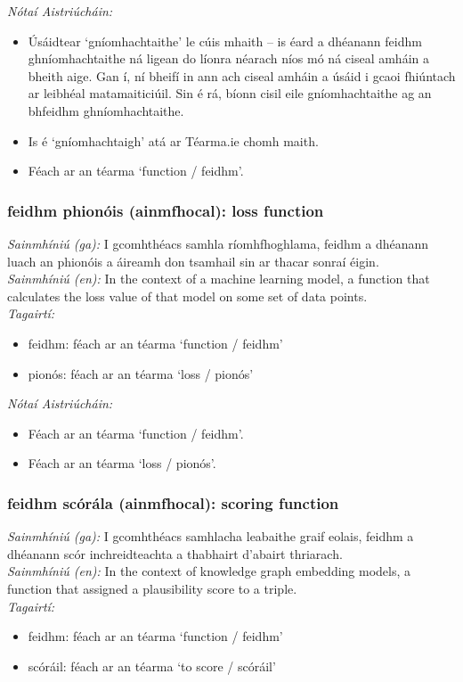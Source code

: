  \noindent \textit{Nótaí Aistriúcháin:}
\begin{itemize}
	\item Úsáidtear `gníomhachtaithe' le cúis mhaith -- is éard a dhéanann feidhm ghníomhachtaithe ná ligean do líonra néarach níos mó ná ciseal amháin a bheith aige. Gan í, ní bheifí in ann ach ciseal amháin a úsáid i gcaoi fhiúntach ar leibhéal matamaiticiúil. Sin é rá, bíonn cisil eile gníomhachtaithe ag an bhfeidhm ghníomhachtaithe.
	\item Is é `gníomhachtaigh' atá ar Téarma.ie chomh maith.
	\item Féach ar an téarma `function / feidhm'.
\end{itemize}


\subsubsection*{feidhm phionóis (ainmfhocal): loss function}
 \noindent \textit{Sainmhíniú (ga):} I gcomhthéacs samhla ríomhfhoghlama, feidhm a dhéanann luach an phionóis a áireamh don tsamhail sin ar thacar sonraí éigin.
\\
 \noindent \textit{Sainmhíniú (en):} In the context of a machine learning model, a function that calculates the loss value of that model on some set of data points.
\\
 \noindent \textit{Tagairtí:}
\begin{itemize}
	\item feidhm: féach ar an téarma `function / feidhm'
	\item pionós: féach ar an téarma `loss / pionós'
\end{itemize}

 \noindent \textit{Nótaí Aistriúcháin:}
\begin{itemize}
	\item Féach ar an téarma `function / feidhm'.
	\item Féach ar an téarma `loss / pionós'.
\end{itemize}


\subsubsection*{feidhm scórála (ainmfhocal): scoring function}
 \noindent \textit{Sainmhíniú (ga):} I gcomhthéacs samhlacha leabaithe graif eolais, feidhm a dhéanann scór inchreidteachta a thabhairt d'abairt thriarach.
\\
 \noindent \textit{Sainmhíniú (en):} In the context of knowledge graph embedding models, a function that assigned a plausibility score to a triple.
\\
 \noindent \textit{Tagairtí:}
\begin{itemize}
	\item feidhm: féach ar an téarma `function / feidhm'
	\item scóráil: féach ar an téarma `to score / scóráil'
\end{itemize}

